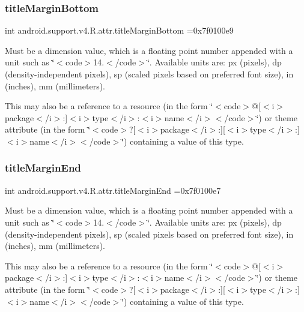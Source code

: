 \subsubsection{\texorpdfstring{title\+Margin\+Bottom}{titleMarginBottom}}
{\footnotesize\ttfamily int android.\+support.\+v4.\+R.\+attr.\+title\+Margin\+Bottom =0x7f0100e9\hspace{0.3cm}{\ttfamily [static]}}

Must be a dimension value, which is a floating point number appended with a unit such as \char`\"{}$<$code$>$14.\+5sp$<$/code$>$\char`\"{}. Available units are\+: px (pixels), dp (density-\/independent pixels), sp (scaled pixels based on preferred font size), in (inches), mm (millimeters). 

This may also be a reference to a resource (in the form \char`\"{}$<$code$>$@\mbox{[}$<$i$>$package$<$/i$>$\+:\mbox{]}$<$i$>$type$<$/i$>$\+:$<$i$>$name$<$/i$>$$<$/code$>$\char`\"{}) or theme attribute (in the form \char`\"{}$<$code$>$?\mbox{[}$<$i$>$package$<$/i$>$\+:\mbox{]}\mbox{[}$<$i$>$type$<$/i$>$\+:\mbox{]}$<$i$>$name$<$/i$>$$<$/code$>$\char`\"{}) containing a value of this type. \mbox{\label{classandroid_1_1support_1_1v4_1_1R_1_1attr_afc14c13ceb344e3b222227ab895b9d5d}} 
\subsubsection{\texorpdfstring{title\+Margin\+End}{titleMarginEnd}}
{\footnotesize\ttfamily int android.\+support.\+v4.\+R.\+attr.\+title\+Margin\+End =0x7f0100e7\hspace{0.3cm}{\ttfamily [static]}}

Must be a dimension value, which is a floating point number appended with a unit such as \char`\"{}$<$code$>$14.\+5sp$<$/code$>$\char`\"{}. Available units are\+: px (pixels), dp (density-\/independent pixels), sp (scaled pixels based on preferred font size), in (inches), mm (millimeters). 

This may also be a reference to a resource (in the form \char`\"{}$<$code$>$@\mbox{[}$<$i$>$package$<$/i$>$\+:\mbox{]}$<$i$>$type$<$/i$>$\+:$<$i$>$name$<$/i$>$$<$/code$>$\char`\"{}) or theme attribute (in the form \char`\"{}$<$code$>$?\mbox{[}$<$i$>$package$<$/i$>$\+:\mbox{]}\mbox{[}$<$i$>$type$<$/i$>$\+:\mbox{]}$<$i$>$name$<$/i$>$$<$/code$>$\char`\"{}) containing a value of this type. \mbox{\label{classandroid_1_1support_1_1v4_1_1R_1_1attr_a68567d454e62f7fd26ab186363b999e8}} 

